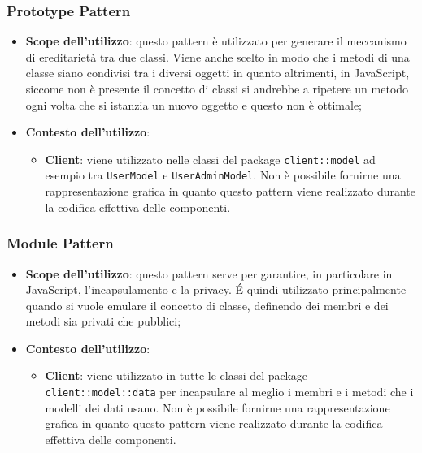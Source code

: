 	\subsubsection{Prototype Pattern} %
	\label{ssub:prototype_pattern}
		\begin{itemize}
			\item \textbf{Scope dell'utilizzo}: questo pattern è utilizzato per generare il meccanismo di ereditarietà tra due classi. Viene anche scelto in modo che i metodi di una classe siano condivisi tra i diversi oggetti in quanto altrimenti, in JavaScript, siccome non è presente il concetto di classi si andrebbe a ripetere un metodo ogni volta che si istanzia un nuovo oggetto e questo non è ottimale;
			\item \textbf{Contesto dell'utilizzo}:
				\begin{itemize}
					\item \textbf{Client}: viene utilizzato nelle classi del package \texttt{client::model} ad esempio tra \texttt{UserModel} e \texttt{UserAdminModel}. \newline
					Non è possibile fornirne una rappresentazione grafica in quanto questo pattern viene realizzato durante la codifica effettiva delle componenti.
				\end{itemize}
		\end{itemize}

	\subsubsection{Module Pattern} %
	\label{ssub:module_pattern}
		\begin{itemize}
			\item \textbf{Scope dell'utilizzo}: questo pattern serve per garantire, in particolare in JavaScript, l'incapsulamento e la privacy. \'E quindi utilizzato principalmente quando si vuole emulare il concetto di classe, definendo dei membri e dei metodi sia privati che pubblici;
			\item \textbf{Contesto dell'utilizzo}:
				\begin{itemize}
					\item \textbf{Client}: viene utilizzato in tutte le classi del package \texttt{client::model::data} per incapsulare al meglio i membri e i metodi che i modelli dei dati usano. \newline
					Non è possibile fornirne una rappresentazione grafica in quanto questo pattern viene realizzato durante la codifica effettiva delle componenti.
				\end{itemize}
		\end{itemize}

